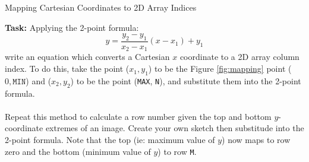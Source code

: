 \documentclass{lab}
\begin{document}
\begin{task}{Mapping Cartesian Coordinates to 2D Array Indices}{}
\begin{figure}[H]
\end{figure}
\textbf{Task:} Applying the 2-point formula:
\begin{equation}
y = \frac{y_2 - y_1}{x_2 - x_1}(x-x_1)+y_1
\end{equation}
write an equation which converts a Cartesian $x$ coordinate to a 2D array column index. To do this, take the point ($x_1,y_1$) to be the Figure \ref{fig:mapping} point ($0,\texttt{MIN}$) and ($x_2,y_2$) to be the point (\texttt{MAX}, \texttt{N}), and substitute them into the 2-point formula.
\\~\\
Repeat this method to calculate a row number given the top and bottom $y$-coordinate extremes of an image. Create your own sketch then substitude into the 2-point formula. Note that the top (ie: maximum value of $y$) now maps to row zero and the bottom (minimum value of $y$) to row \texttt{M}.
\end{task}
\end{document}
